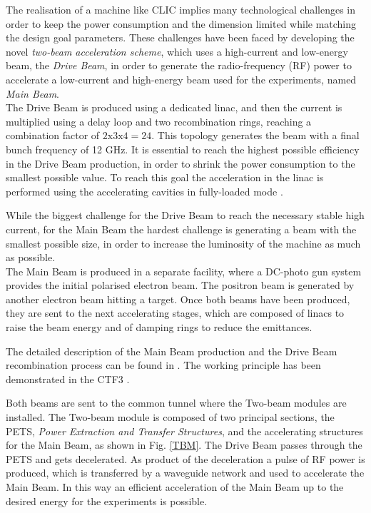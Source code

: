 The realisation of a machine like CLIC implies many technological challenges in order to keep the power consumption and the dimension limited while matching the design goal parameters. These challenges have been faced by developing the novel \textit{two-beam acceleration scheme}, which uses a high-current and low-energy beam, the \textit{Drive Beam}, in order to generate the radio-frequency (RF) power to accelerate a low-current and high-energy beam used for the experiments, named \textit{Main Beam}. \\
The Drive Beam is produced using a dedicated linac, and then the current is multiplied using a delay loop and two recombination rings, reaching a combination factor of $2\text{x}3\text{x}4=24$. This topology generates the beam with a final bunch frequency of 12 GHz. It is essential to reach the highest possible efficiency in the Drive Beam production, in order to shrink the power consumption to the smallest possible value. To reach this goal the acceleration in the linac is performed using the accelerating cavities in fully-loaded mode \cite{Corsini:791372}.

While the biggest challenge for the Drive Beam to reach the necessary stable high current, for the Main Beam the hardest challenge is generating a beam with the smallest possible size, in order to increase the luminosity of the machine as much as possible.\\
The Main Beam is produced in a separate facility, where a DC-photo gun system provides the initial polarised electron beam. The positron beam is generated by another electron beam hitting a target. Once both beams have been produced, they are sent to the next accelerating stages, which are composed of linacs to raise the beam energy and of damping rings to reduce the emittances. 

The detailed description of the Main Beam production and the Drive Beam recombination process can be found in \cite{CLIC:cdr}. The working principle has been demonstrated in the CTF3 \cite{CTF:drive_beam}. 

Both beams are sent to the common tunnel where the Two-beam modules are installed. The Two-beam module is composed of two principal sections, the PETS, \textit{Power Extraction and Transfer Structures}, and the accelerating structures for the Main Beam, as shown in Fig. \ref{TBM}. The Drive Beam passes through the PETS and gets decelerated. As product of the deceleration a pulse of RF power is produced, which is transferred by a waveguide network and used to accelerate the Main Beam. In this way  an efficient acceleration of the Main Beam up to the desired energy for the experiments is possible.

